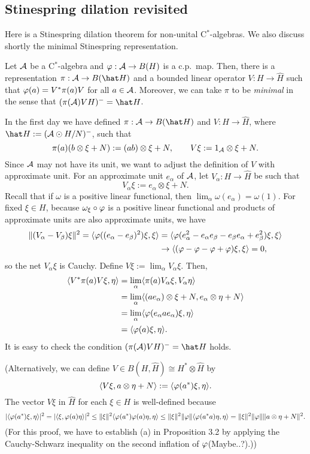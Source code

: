 \documentclass{../../small}
\begin{document}
\subsection{Stinespring dilation revisited}

Here is a Stinespring dilation theorem for non-unital C$^*$-algebras.
We also discuss shortly the minimal Stinespring representation.

\begin{thm}
Let $\mathcal{A}$ be a C$^*$-algebra and $\varphi:\mathcal{A}\to B(H)$ is a c.p.~map.
Then, there is a representation $\pi:\cA\to B(\hat H)$ and a bounded linear operator $V:H\to\hat H$ such that $\varphi(a)=V^*\pi(a)V$ for all $a\in\mathcal{A}$.
Moreover, we can take $\pi$ to be \emph{minimal} in the sense that $(\pi(\cA)VH)^-=\hat H$.
\end{thm}
\begin{pf}
In the first day we have defined $\pi:\cA\to B(\hat H)$ and $V:H\to\hat H$, where $\hat H:=(\cA\odot H/N)^-$, such that
\[\pi(a)(b\otimes\xi+N):=(ab)\otimes\xi+N,\qquad V\xi:=1_{\mathcal{A}}\otimes\xi+N.\]
Since $\mathcal{A}$ may not have its unit, we want to adjust the definition of $V$ with approximate unit.
For an approximate unit $e_\alpha$ of $\mathcal{A}$, let $V_\alpha:H\to\hat H$ be such that
\[V_\alpha\xi:=e_\alpha\otimes\xi+N.\]
Recall that if $\omega$ is a positive linear functional, then $\lim_\alpha\omega(e_\alpha)=\omega(1)$.
For fixed $\xi\in H$, because $\omega_\xi\circ\varphi$ is a positive linear functional and products of approximate units are also approximate units, we have
\begin{align*}
\|(V_\alpha-V_\beta)\xi\|^2=\langle\varphi((e_\alpha-e_\beta)^2)\xi,\xi\rangle&=\langle\varphi(e_\alpha^2-e_\alpha e_\beta-e_\beta e_\alpha+e_\beta^2)\xi,\xi\rangle\\
&\to\langle(\varphi-\varphi-\varphi+\varphi)\xi,\xi\rangle=0,
\end{align*}
so the net $V_\alpha\xi$ is Cauchy.
Define $V\xi:=\lim_\alpha V_\alpha\xi$.
Then,
\begin{align*}
\langle V^*\pi(a)V\xi,\eta\rangle
&=\lim_\alpha\langle\pi(a)V_\alpha\xi,V_\alpha\eta\rangle\\
&=\lim_\alpha\langle(ae_\alpha)\otimes\xi+N,e_\alpha\otimes\eta+N\rangle\\
&=\lim_\alpha\langle\varphi(e_\alpha ae_\alpha)\xi,\eta\rangle\\
&=\langle\varphi(a)\xi,\eta\rangle.
\end{align*}
It is easy to check the condition $(\pi(\cA)VH)^-=\hat H$ holds.

(Alternatively, we can define $V\in B(H,\hat H)\cong H^*\otimes\hat H$ by
\[\langle V\xi,a\otimes\eta+N\rangle:=\langle\varphi(a^*)\xi,\eta\rangle.\]
The vector $V\xi$ in $\hat H$ for each $\xi\in H$ is well-defined because
\[|\langle\varphi(a^*)\xi,\eta\rangle|^2=|\langle\xi,\varphi(a)\eta\rangle|^2\le\|\xi\|^2\langle\varphi(a^*)\varphi(a)\eta,\eta\rangle\le\|\xi\|^2\|\varphi\|\langle\varphi(a^*a)\eta,\eta\rangle=\|\xi\|^2\|\varphi\|\|a\otimes\eta+N\|^2.\]
(For this proof, we have to establish (a) in Proposition 3.2 by applying the Cauchy-Schwarz inequality on the second inflation of $\varphi$(Maybe..?).))
\end{pf}
\end{document}
